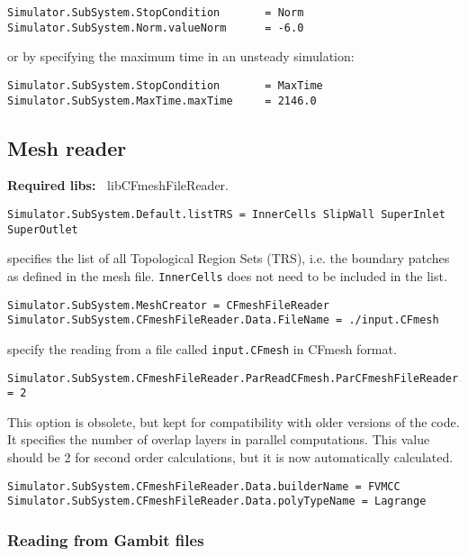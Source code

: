 \documentclass[11pt]{article}
\begin{document}
\begin{lstlisting}[breaklines]
Simulator.SubSystem.StopCondition       = Norm
Simulator.SubSystem.Norm.valueNorm      = -6.0
\end{lstlisting}
or by specifying the maximum time in an unsteady simulation:

\begin{lstlisting}[breaklines]
Simulator.SubSystem.StopCondition       = MaxTime
Simulator.SubSystem.MaxTime.maxTime     = 2146.0
\end{lstlisting}

\subsection{Mesh reader}

{\bf Required libs:~} libCFmeshFileReader.

\begin{lstlisting}[breaklines]
Simulator.SubSystem.Default.listTRS = InnerCells SlipWall SuperInlet SuperOutlet
\end{lstlisting}
specifies the list of all Topological Region Sets (TRS), i.e. the boundary patches as defined in the mesh file.
{\tt InnerCells} does not need to be included in the list.

\begin{lstlisting}[breaklines]
Simulator.SubSystem.MeshCreator = CFmeshFileReader
Simulator.SubSystem.CFmeshFileReader.Data.FileName = ./input.CFmesh
\end{lstlisting}
specify the reading from a file called {\tt input.CFmesh} in CFmesh format. 

\begin{lstlisting}[breaklines]
Simulator.SubSystem.CFmeshFileReader.ParReadCFmesh.ParCFmeshFileReader.NbOverlapLayers = 2
\end{lstlisting}
This option is obsolete, but kept for compatibility with older versions of the code. It specifies the number 
of overlap layers in parallel computations. This value should be 2 for second order calculations, 
but it is now automatically calculated.

\begin{lstlisting}[breaklines]
Simulator.SubSystem.CFmeshFileReader.Data.builderName = FVMCC
Simulator.SubSystem.CFmeshFileReader.Data.polyTypeName = Lagrange
\end{lstlisting}

\subsubsection{Reading from Gambit files}
\end{document}
